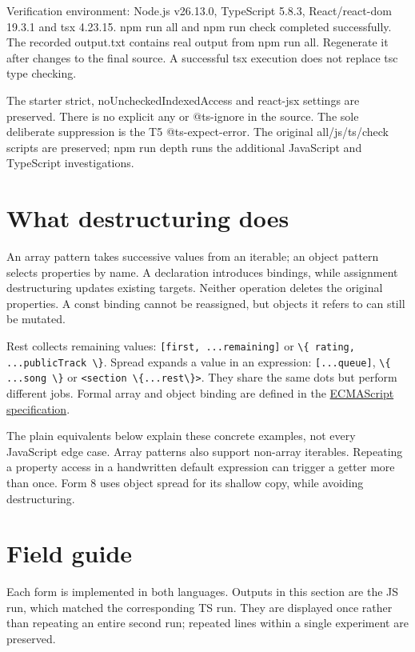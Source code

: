 \documentclass[
  10pt,
  a4paper,
  titlepage]{article}
\newcommand{\passthrough}[1]{#1}
\begin{document}
Verification environment: Node.js v26.13.0, TypeScript 5.8.3,
React/react-dom 19.3.1 and tsx 4.23.15. npm run all and npm run check
completed successfully. The recorded output.txt contains real output
from npm run all. Regenerate it after changes to the final source. A
successful tsx execution does not replace tsc type checking.

The starter strict, noUncheckedIndexedAccess and react-jsx settings are
preserved. There is no explicit any or @ts-ignore in the source. The
sole deliberate suppression is the T5 @ts-expect-error. The original
all/js/ts/check scripts are preserved; npm run depth runs the additional
JavaScript and TypeScript investigations.

\section{What destructuring does}\label{what-destructuring-does}

An array pattern takes successive values from an iterable; an object
pattern selects properties by name. A declaration introduces bindings,
while assignment destructuring updates existing targets. Neither
operation deletes the original properties. A const binding cannot be
reassigned, but objects it refers to can still be mutated.

Rest collects remaining values:
\passthrough{\lstinline![first, ...remaining]!} or
\passthrough{\lstinline!\{ rating, ...publicTrack \}!}. Spread expands a
value in an expression: \passthrough{\lstinline![...queue]!},
\passthrough{\lstinline!\{ ...song \}!} or
\passthrough{\lstinline!<section \{...rest\}>!}. They share the same
dots but perform different jobs. Formal array and object binding are
defined in the
\href{https://tc39.es/ecma262/multipage/ecmascript-language-statements-and-declarations.html\#sec-destructuring-binding-patterns}{ECMAScript
specification}.

The plain equivalents below explain these concrete examples, not every
JavaScript edge case. Array patterns also support non-array iterables.
Repeating a property access in a handwritten default expression can
trigger a getter more than once. Form 8 uses object spread for its
shallow copy, while avoiding destructuring.

\section{Field guide}\label{field-guide}

Each form is implemented in both languages. Outputs in this section are
the JS run, which matched the corresponding TS run. They are displayed
once rather than repeating an entire second run; repeated lines within a
single experiment are preserved.
\end{document}
